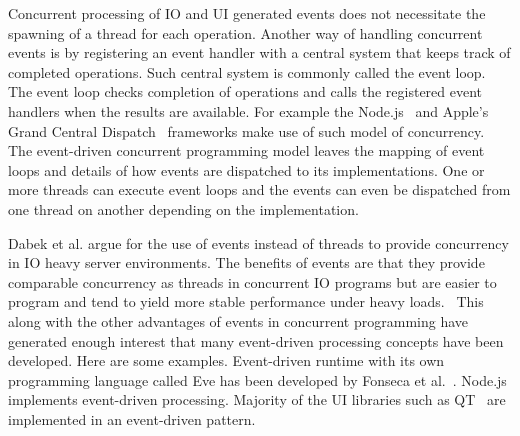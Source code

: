Concurrent processing of IO and UI generated events does not necessitate the spawning of a thread for each operation. Another way of handling concurrent events is by registering an event handler with a central system that keeps track of completed operations. Such central system is commonly called the event loop. The event loop checks completion of operations and calls the registered event handlers when the results are available. For example the Node.js~\cite{tilkov2010node} and Apple's Grand Central Dispatch~\cite{sakamoto2012grand} frameworks make use of such model of concurrency. The event-driven concurrent programming model leaves the mapping of event loops and details of how events are dispatched to its implementations. One or more threads can execute event loops and the events can even be dispatched from one thread on another depending on the implementation.

Dabek et al. argue for the use of events instead of threads to provide concurrency in IO heavy server environments. The benefits of events are that they provide comparable concurrency as threads in concurrent IO programs but are easier to program and tend to yield more stable performance under heavy loads.~\cite{dabek2002event} This along with the other advantages of events in concurrent programming have generated enough interest that many event-driven processing concepts have been developed. Here are some examples. Event-driven runtime with its own programming language called Eve has been developed by Fonseca et al.~\cite{fonseca2014eve}. Node.js implements event-driven processing. Majority of the UI libraries such as QT~\cite{blanchette2006cpp} are implemented in an event-driven pattern.
